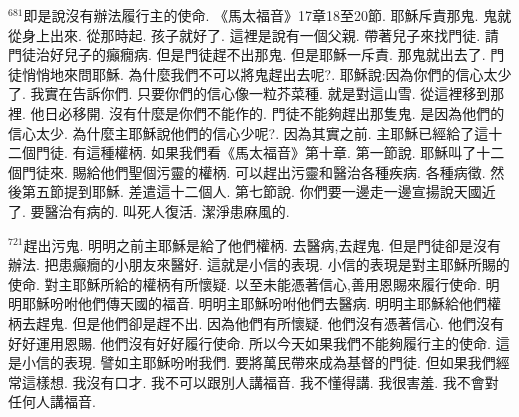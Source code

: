 \documentclass{book}
\begin{document}
$^{681}$即是說沒有辦法履行主的使命.
《馬太福音》17章18至20節.
耶穌斥責那鬼.
鬼就從身上出來.
從那時起.
孩子就好了.
這裡是說有一個父親.
帶著兒子來找門徒.
請門徒治好兒子的癲癇病.
但是門徒趕不出那鬼.
但是耶穌一斥責.
那鬼就出去了.
門徒悄悄地來問耶穌.
為什麼我們不可以將鬼趕出去呢?.
耶穌說:因為你們的信心太少了.
我實在告訴你們.
只要你們的信心像一粒芥菜種.
就是對這山雪.
從這裡移到那裡.
他日必移開.
沒有什麼是你們不能作的.
門徒不能夠趕出那隻鬼.
是因為他們的信心太少.
為什麼主耶穌說他們的信心少呢?.
因為其實之前.
主耶穌已經給了這十二個門徒.
有這種權柄.
如果我們看《馬太福音》第十章.
第一節說.
耶穌叫了十二個門徒來.
賜給他們聖個污靈的權柄.
可以趕出污靈和醫治各種疾病.
各種病徵.
然後第五節提到耶穌.
差遣這十二個人.
第七節說.
你們要一邊走一邊宣揚說天國近了.
要醫治有病的.
叫死人復活.
潔淨患麻風的.

$^{721}$趕出污鬼.
明明之前主耶穌是給了他們權柄.
去醫病,去趕鬼.
但是門徒卻是沒有辦法.
把患癲癇的小朋友來醫好.
這就是小信的表現.
小信的表現是對主耶穌所賜的使命.
對主耶穌所給的權柄有所懷疑.
以至未能憑著信心,善用恩賜來履行使命.
明明耶穌吩咐他們傳天國的福音.
明明主耶穌吩咐他們去醫病.
明明主耶穌給他們權柄去趕鬼.
但是他們卻是趕不出.
因為他們有所懷疑.
他們沒有憑著信心.
他們沒有好好運用恩賜.
他們沒有好好履行使命.
所以今天如果我們不能夠履行主的使命.
這是小信的表現.
譬如主耶穌吩咐我們.
要將萬民帶來成為基督的門徒.
但如果我們經常這樣想.
我沒有口才.
我不可以跟別人講福音.
我不懂得講.
我很害羞.
我不會對任何人講福音.
\newpage
\end{document}
